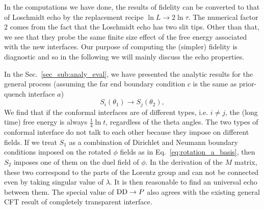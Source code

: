 

In the computations we have done, the results of fidelity can be converted to that of Loschmidt echo by the replacement recipe $ \ln L \rightarrow 2 \ln \tau$. The numerical factor $2$ comes from the fact that the Loschmidt echo has two slit tips. Other than that, we see that they probe the same finite size effect of the free energy associated with the new interfaces. Our purpose of computing the (simpler) fidelity is diagnostic and so in the following we will mainly discuss the echo properties. 

In the Sec.~\ref{sec_sub:analy_eval}, we have presented the analytic results for the general process (assuming the far end boundary condition $c$ is the same as prior-quench interface $a$) 
\begin{equation}
 S_i( \theta_1 ) \rightarrow S_j( \theta_2 ),
\end{equation}
We find that if the conformal interfaces are of different types, i.e. $i \ne j$, the (long time) free energy is always $\frac{1}{4} \ln t$, regardless of the theta angles. The two types of conformal interface do not talk to each other because they impose on different fields. If we treat $S_1$ as a combination of Dirichlet and Neumann boundary conditions imposed on the rotated $\phi$ fields as in Eq.~\eqref{eq:rotation_a_basis}, then $S_2$ imposes one of them on the duel field of $\phi$. In the derivation of the $M$ matrix, these two correspond to the parts of the Lorentz group and can not be connected even by taking singular value of $\lambda$. It is then reasonable to find an universal echo between them. The special value of ${\rm DD} \rightarrow P$ also agrees with the existing general CFT result of completely transparent interface\cite{stephan_logarithmic_2013,stephan_local_2011,vasseur_universal_2014,vasseur_crossover_2013,kennes_universal_2014}. 



